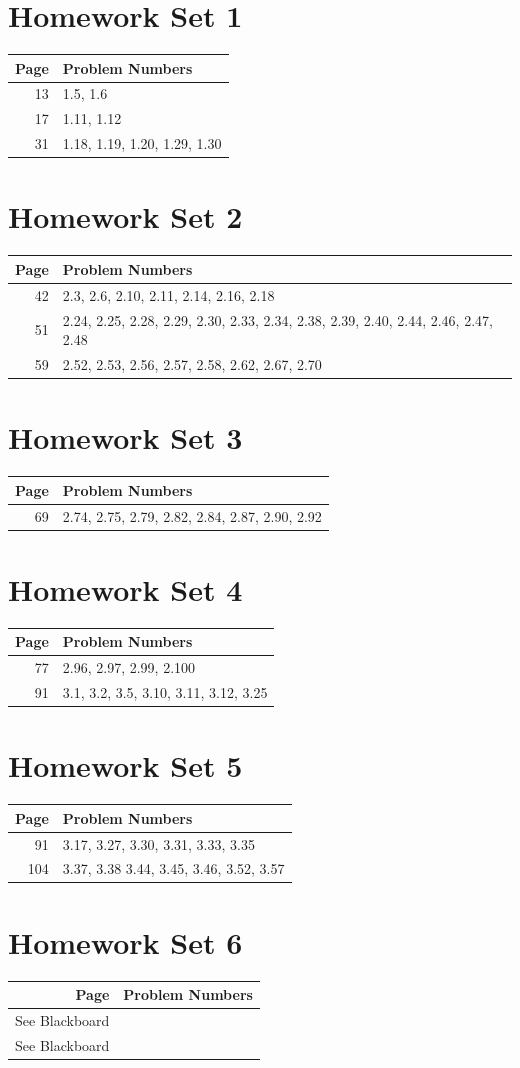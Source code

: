 \documentclass{book}
\begin{document}
\section{Homework Set 1}
\begin{tabular}{r|l}
Page & Problem Numbers\\
\hline
13 & 1.5, 1.6\\
17 & 1.11, 1.12\\
31 & 1.18, 1.19, 1.20, 1.29, 1.30\\
\end{tabular}

\section{Homework Set 2}
\begin{tabular}{r|l}
Page & Problem Numbers\\
\hline
42 & 2.3, 2.6, 2.10, 2.11, 2.14, 2.16, 2.18\\
51 & 2.24, 2.25, 2.28, 2.29, 2.30, 2.33, 2.34, 2.38, 2.39, 2.40, 2.44, 2.46, 2.47, 2.48\\
59 & 2.52, 2.53, 2.56, 2.57, 2.58, 2.62, 2.67, 2.70\\
\end{tabular}

\section{Homework Set 3}
\begin{tabular}{r|l}
Page & Problem Numbers\\
\hline
69 & 2.74, 2.75, 2.79, 2.82, 2.84, 2.87, 2.90, 2.92\\
\end{tabular}

\section{Homework Set 4}
\begin{tabular}{r|l}
Page & Problem Numbers\\
\hline
77 & 2.96, 2.97, 2.99, 2.100\\
91 & 3.1, 3.2, 3.5, 3.10, 3.11, 3.12, 3.25\\
\end{tabular}

\section{Homework Set 5}
\begin{tabular}{r|l}
Page & Problem Numbers\\
\hline
91 & 3.17, 3.27, 3.30, 3.31, 3.33, 3.35\\
104 & 3.37, 3.38 3.44, 3.45, 3.46, 3.52, 3.57\\
\end{tabular}

\section{Homework Set 6}
\begin{tabular}{r|l}
Page & Problem Numbers\\
\hline
See Blackboard\\
See Blackboard\\
\end{tabular}

\newpage
\nocite{textbook}
\printbibliography
\end{document}
